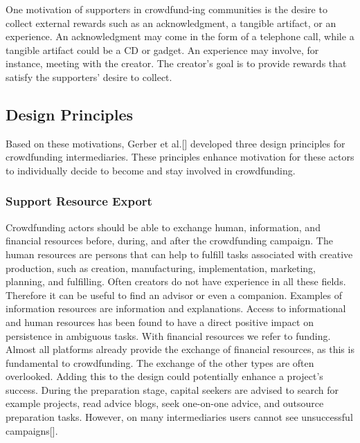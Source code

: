 One motivation of supporters in crowdfund-ing communities is the desire to collect external rewards such as an acknowledgment, a tangible artifact, or an experience. An acknowledgment may come in the form of a telephone call, while a tangible artifact could be a CD or gadget. An experience may involve, for instance, meeting with the creator. The creator’s goal is to provide rewards that satisfy the supporters’ desire to collect.

\subsection{Design Principles}
Based on these motivations, Gerber et al.[\cite{crowdMotiv}] developed three design principles for crowdfunding
intermediaries. These principles enhance motivation for these actors to individually decide to become and
stay involved in crowdfunding.
\subsubsection*{Support Resource Export}
Crowdfunding actors should be able to exchange human, information, and financial resources before, during, and after the crowdfunding campaign. The human resources are persons that can help to fulfill tasks
associated with creative production, such as creation, manufacturing, implementation, marketing, planning,
and fulfilling. Often creators do not have experience in all these fields. Therefore it can be useful to find
an advisor or even a companion. Examples of information resources are information and explanations. Access to informational and human resources has been found to have a direct positive impact on persistence
in ambiguous tasks. With financial resources we refer to funding. Almost all platforms already provide the
exchange of financial resources, as this is fundamental to crowdfunding. The exchange of the other types are
often overlooked. Adding this to the design could potentially enhance a project’s success.
During the preparation stage, capital seekers are advised to search for example projects, read advice blogs,
seek one-on-one advice, and outsource preparation tasks. However, on many intermediaries users cannot
see unsuccessful campaigns[\cite{10.1145/2531602.2531715}].
